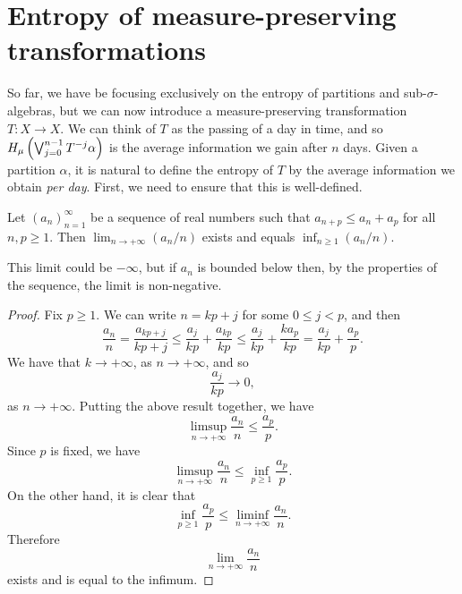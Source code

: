 \section{\texorpdfstring{\sloppy Entropy of measure-preserving transformations}{Entropy of measure-preserving transformations}}
So far, we have be focusing exclusively on the entropy of partitions and sub-$\sigma$-algebras, but we can now introduce a measure-preserving transformation $T : X \to X$. We can think of $T$ as the passing of a day in time, and so $H_\mu\left(\bigvee_{j = 0}^{n - 1}{T^{-j}{\alpha}}\right)$ is the average information we gain after $n$ days. Given a partition $\alpha$, it is natural to define the entropy of $T$ by the average information we obtain \emph{per day}. First, we need to ensure that this is well-defined.

\begin{theorem} \label{thm:walters-4-9}
	Let $(a_n)_{n = 1}^\infty$ be a sequence of real numbers such that $a_{n + p} \leq a_n + a_p$ for all $n, p \geq 1$. Then $\lim_{n \to +\infty}(a_n / n)$ exists and equals $\inf_{n \geq 1}(a_n / n)$.
	
	This limit could be $-\infty$, but if $a_n$ is bounded below then, by the properties of the sequence, the limit is non-negative.
	\begin{proof}
		Fix $p \geq 1$. We can write $n = kp + j$ for some $0 \leq j < p$, and then
		\[
			\frac{a_n}{n} = \frac{a_{kp + j}}{kp + j} \leq \frac{a_j}{kp} + \frac{a_{kp}}{kp} \leq \frac{a_j}{kp} + \frac{ka_p}{kp} = \frac{a_j}{kp} + \frac{a_p}{p}.
		\]
		We have that $k \to +\infty$, as $n \to +\infty$, and so
		\[
			\frac{a_j}{kp} \to 0,
		\]
		as $n \to +\infty$. Putting the above result together, we have
		\[
			\limsup_{n \to +\infty}{\frac{a_n}{n}} \leq \frac{a_p}{p}.
		\]
		Since $p$ is fixed, we have
		\[
			\limsup_{n \to +\infty}{\frac{a_n}{n}} \leq \inf_{p \geq 1}{\frac{a_p}{p}}.
		\]
		On the other hand, it is clear that
		\[
			\inf_{p \geq 1}{\frac{a_p}{p}} \leq \liminf_{n \to +\infty}{\frac{a_n}{n}}.
		\]
		Therefore
		\[
			\lim_{n \to +\infty}{\frac{a_n}{n}}
		\]
		exists and is equal to the infimum.
	\end{proof}
\end{theorem}

